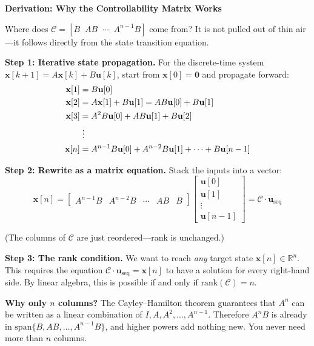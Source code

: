 \vspace{0.5em}
\begin{mdframed}[linewidth=1pt, innertopmargin=10pt, innerbottommargin=10pt]
\textbf{Derivation: Why the Controllability Matrix Works}

\vspace{0.3em}
Where does $\mathcal{C} = [B \;\; AB \;\; \cdots \;\; A^{n-1}B]$ come from? It is not pulled out of thin air---it follows directly from the state transition equation.

\textbf{Step 1: Iterative state propagation.} For the discrete-time system $\mathbf{x}[k+1] = A\mathbf{x}[k] + B\mathbf{u}[k]$, start from $\mathbf{x}[0] = \mathbf{0}$ and propagate forward:
\begin{align}
\mathbf{x}[1] &= B\mathbf{u}[0] \\
\mathbf{x}[2] &= A\mathbf{x}[1] + B\mathbf{u}[1] = AB\mathbf{u}[0] + B\mathbf{u}[1] \\
\mathbf{x}[3] &= A^2B\mathbf{u}[0] + AB\mathbf{u}[1] + B\mathbf{u}[2] \\
&\;\vdots \notag \\
\mathbf{x}[n] &= A^{n-1}B\mathbf{u}[0] + A^{n-2}B\mathbf{u}[1] + \cdots + B\mathbf{u}[n-1]
\end{align}

\textbf{Step 2: Rewrite as a matrix equation.} Stack the inputs into a vector:
\begin{equation}
\mathbf{x}[n] = \begin{bmatrix} A^{n-1}B & A^{n-2}B & \cdots & AB & B \end{bmatrix}
\begin{bmatrix} \mathbf{u}[0] \\ \mathbf{u}[1] \\ \vdots \\ \mathbf{u}[n-1] \end{bmatrix}
= \mathcal{C} \cdot \mathbf{u}_{\text{seq}}
\end{equation}

(The columns of $\mathcal{C}$ are just reordered---rank is unchanged.)

\textbf{Step 3: The rank condition.} We want to reach \textit{any} target state $\mathbf{x}[n] \in \mathbb{R}^n$. This requires the equation $\mathcal{C} \cdot \mathbf{u}_{\text{seq}} = \mathbf{x}[n]$ to have a solution for every right-hand side. By linear algebra, this is possible if and only if $\text{rank}(\mathcal{C}) = n$.

\textbf{Why only $n$ columns?} The Cayley--Hamilton theorem guarantees that $A^n$ can be written as a linear combination of $I, A, A^2, \ldots, A^{n-1}$. Therefore $A^n B$ is already in $\text{span}\{B, AB, \ldots, A^{n-1}B\}$, and higher powers add nothing new. You never need more than $n$ columns.


\end{mdframed}
